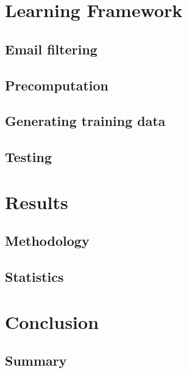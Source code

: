 \documentclass[senior,oneside]{UIUC}
\begin{document}
\chapter{Learning Framework}
\section{Email filtering}
\section{Precomputation}
\section{Generating training data}
\section{Testing}

\chapter{Results}
\section{Methodology}
\section{Statistics}

\chapter{Conclusion}
\section{Summary}


% 
\end{document}
